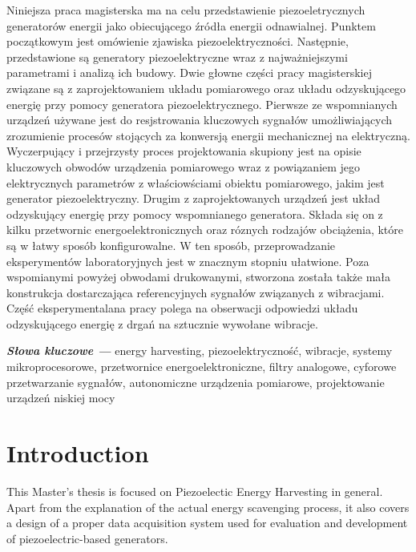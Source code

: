 \documentclass[12pt,a4paper]{article}
\providecommand{\slowakluczowe}[1]
{
  \small	
  \textbf{\textit{Słowa kluczowe ---}} #1
}
\begin{document}
Niniejsza praca magisterska ma na celu przedstawienie piezoeletrycznych generatorów energii jako obiecującego źródła energii odnawialnej. Punktem początkowym jest omówienie zjawiska piezoelektryczności. Następnie, przedstawione są generatory piezoelektryczne wraz z najważniejszymi parametrami i analizą ich budowy. Dwie głowne części pracy magisterskiej związane są z zaprojektowaniem układu pomiarowego oraz układu odzyskującego energię przy pomocy generatora piezoelektrycznego. Pierwsze ze wspomnianych urządzeń używane jest do resjstrowania kluczowych sygnałów umożliwiających zrozumienie procesów stojących za konwersją energii mechanicznej na elektryczną. Wyczerpujący i przejrzysty proces projektowania skupiony jest na opisie kluczowych obwodów urządzenia pomiarowego wraz z powiązaniem jego elektrycznych parametrów z właściowściami obiektu pomiarowego, jakim jest generator piezoelektryczny. Drugim z zaprojektowanych urządzeń jest układ odzyskujący energię przy pomocy wspomnianego generatora. Składa się on z kilku przetwornic energoelektronicznych oraz róznych rodzajów obciążenia, które są w łatwy sposób konfigurowalne. W ten sposób, przeprowadzanie eksperymentów laboratoryjnych jest w znacznym stopniu ułatwione. Poza wspomianymi powyżej obwodami drukowanymi, stworzona została także mała konstrukcja dostarczająca referencyjnych sygnałów związanych z wibracjami. Część eksperymentalana pracy polega na obserwacji odpowiedzi układu odzyskującego energię z drgań na sztucznie wywołane wibracje.

\par

\hspace{10pt}

\slowakluczowe{energy harvesting, piezoelektryczność, wibracje, systemy mikroprocesorowe, przetwornice energoelektroniczne, filtry analogowe, cyforowe przetwarzanie sygnałów, autonomiczne urządzenia pomiarowe, projektowanie urządzeń niskiej mocy}

\clearpage
\tableofcontents
\clearpage

\section{Introduction}
This Master's thesis is focused on Piezoelectic Energy Harvesting in general. Apart from the explanation of the actual energy scavenging process, it also covers a design of a proper data acquisition system used for evaluation and development of piezoelectric-based generators.
\par
\end{document}
